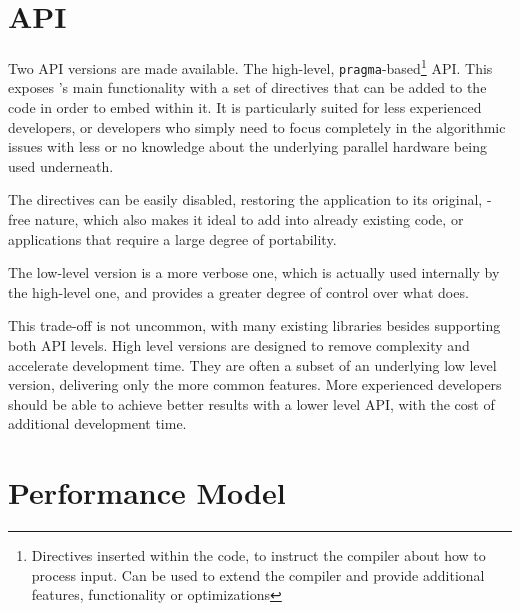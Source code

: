 \documentclass[main.tex]{subfiles}
\begin{document}
\section{API} \label{section:starpu_api}

Two API versions are made available. The high-level, \texttt{pragma}-based\footnote{Directives inserted within the code, to instruct the compiler about how to process input. Can be used to extend the compiler and provide additional features, functionality or optimizations} API. This exposes \starpu's main functionality with a set of directives that can be added to the code in order to embed \starpu within it. It is particularly suited for less experienced developers, or developers who simply need to focus completely in the algorithmic issues with less or no knowledge about the underlying parallel hardware being used underneath.

The directives can be easily disabled, restoring the application to its original, \starpu-free nature, which also makes it ideal to add \starpu into already existing code, or applications that require a large degree of portability.

The low-level version is a more verbose one, which is actually used internally by the high-level one, and provides a greater degree of control over what \starpu does.

This trade-off is not uncommon, with many existing libraries besides \starpu supporting both API levels. High level versions are designed to remove complexity and accelerate development time. They are often a subset of an underlying low level version, delivering only the more common features. More experienced developers should be able to achieve better results with a lower level API, with the cost of additional development time.

\section{Performance Model}
\end{document}
